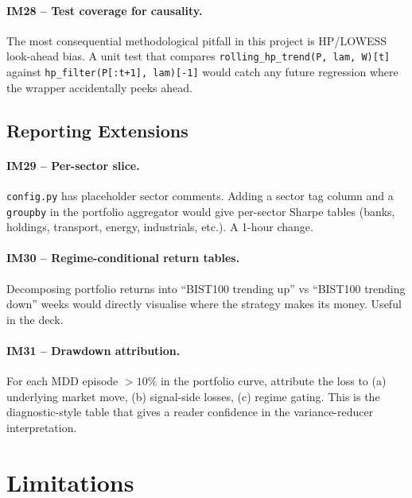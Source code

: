 \documentclass[11pt,a4paper]{article}
\begin{document}
\paragraph{IM28 -- Test coverage for causality.} The most consequential
methodological pitfall in this project is HP/LOWESS look-ahead bias. A unit
test that compares \texttt{rolling\_hp\_trend(P, lam, W)[t]} against
\texttt{hp\_filter(P[:t+1], lam)[-1]} would catch any future regression
where the wrapper accidentally peeks ahead.

\subsection{Reporting Extensions}

\paragraph{IM29 -- Per-sector slice.} \texttt{config.py} has placeholder
sector comments. Adding a sector tag column and a \texttt{groupby} in the
portfolio aggregator would give per-sector Sharpe tables (banks, holdings,
transport, energy, industrials, etc.). A 1-hour change.

\paragraph{IM30 -- Regime-conditional return tables.} Decomposing portfolio
returns into ``BIST100 trending up'' vs ``BIST100 trending down'' weeks
would directly visualise where the strategy makes its money. Useful in the
deck.

\paragraph{IM31 -- Drawdown attribution.} For each MDD episode $>10\%$ in
the portfolio curve, attribute the loss to (a) underlying market move,
(b) signal-side losses, (c) regime gating. This is the diagnostic-style
table that gives a reader confidence in the variance-reducer interpretation.

\section{Limitations}
\end{document}
